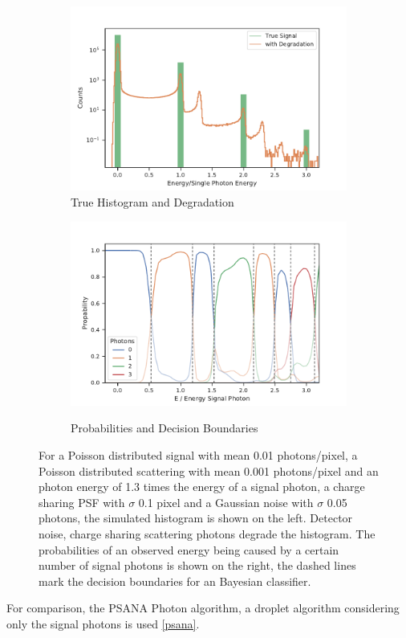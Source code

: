 \begin{figure}
	\centering
	\begin{subfigure}[b]{0.45\textwidth}
		\includegraphics[width=\linewidth]{images/sharing.pdf}
		\caption{True Histogram and Degradation}
	\end{subfigure}
	\begin{subfigure}[b]{0.45\textwidth}
		\includegraphics[width=\linewidth]{images/probs.pdf}
		\label{fig:probs}
		\caption{Probabilities and Decision Boundaries}
	\end{subfigure}
	
	\caption[Histogram, probabilities and decision boundaries for the photon number]{For a Poisson distributed signal with mean 0.01 photons/pixel, a Poisson distributed scattering with mean 0.001 photons/pixel and an photon energy of 1.3 times the energy of a signal photon, a charge sharing PSF with $\sigma$ 0.1 pixel and a Gaussian noise with $\sigma$ 0.05 photons, the simulated histogram is shown on the left. Detector noise, charge sharing scattering photons degrade the histogram. The probabilities of an observed energy being caused by a certain number of signal photons is shown on the right, the dashed lines mark the decision boundaries for an Bayesian classifier.} 
\end{figure}
For comparison, the PSANA Photon algorithm, a droplet algorithm considering only the signal photons is used \ref{psana}.

